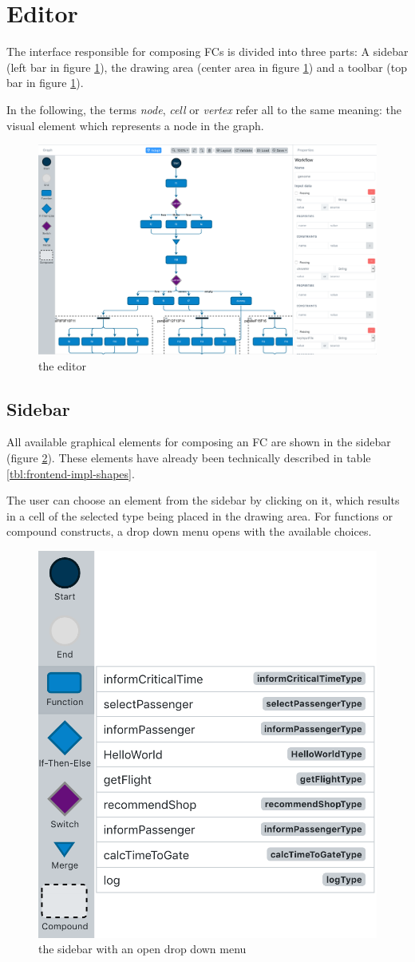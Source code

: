 \documentclass[a4paper,top=25mm,bottom=25mm,12pt,pdftex,halfparskip,twoside,openany,bibtotoc,numbers=noenddot]{scrbook}
\begin{document}
\section{Editor}
The interface responsible for composing FCs is divided into three parts: A sidebar (left bar in figure \ref{fig:editor}), the drawing area (center area in figure \ref{fig:editor}) and a toolbar (top bar in figure \ref{fig:editor}).

In the following, the terms \textit{node}, \textit{cell} or \textit{vertex} refer all to the same meaning: the visual element which represents a node in the graph.

\begin{figure}[H]
  \centering
  \includegraphics[width=\textwidth]{editor}
  \caption{the editor}
  \label{fig:editor}
\end{figure}

\subsection{Sidebar}

All available graphical elements for composing an FC are shown in the sidebar (figure \ref{fig:editor-sidebar}). These elements have already been technically described in table \ref{tbl:frontend-impl-shapes}.

The user can choose an element from the sidebar by clicking on it, which results in a cell of the selected type being placed in the drawing area. For functions or compound constructs, a drop down menu opens with the available choices.

\begin{figure}[H]
\centering
\includegraphics[width=.4\textwidth]{sidebar}
\caption{the sidebar with an open drop down menu}
\label{fig:editor-sidebar}
\end{figure}
\end{document}
